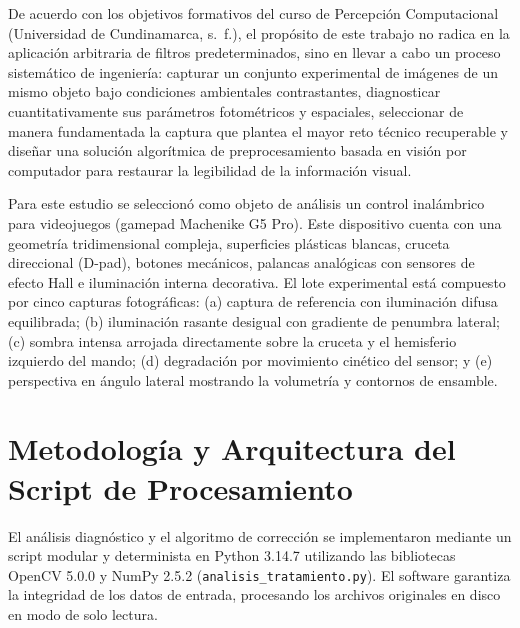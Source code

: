 \documentclass[12pt,letterpaper]{article}
\begin{document}
De acuerdo con los objetivos formativos del curso de Percepci\'on Computacional (Universidad de Cundinamarca, s.~f.), el prop\'osito de este trabajo no radica en la aplicaci\'on arbitraria de filtros predeterminados, sino en llevar a cabo un proceso sistem\'atico de ingenier\'ia: capturar un conjunto experimental de im\'agenes de un mismo objeto bajo condiciones ambientales contrastantes, diagnosticar cuantitativamente sus par\'ametros fotom\'etricos y espaciales, seleccionar de manera fundamentada la captura que plantea el mayor reto t\'ecnico recuperable y dise\~nar una soluci\'on algor\'itmica de preprocesamiento basada en visi\'on por computador para restaurar la legibilidad de la informaci\'on visual.

Para este estudio se seleccion\'o como objeto de an\'alisis un control inal\'ambrico para videojuegos (gamepad Machenike G5 Pro). Este dispositivo cuenta con una geometr\'ia tridimensional compleja, superficies pl\'asticas blancas, cruceta direccional (D-pad), botones mec\'anicos, palancas anal\'ogicas con sensores de efecto Hall e iluminaci\'on interna decorativa. El lote experimental est\'a compuesto por cinco capturas fotogr\'aficas: (a) captura de referencia con iluminaci\'on difusa equilibrada; (b) iluminaci\'on rasante desigual con gradiente de penumbra lateral; (c) sombra intensa arrojada directamente sobre la cruceta y el hemisferio izquierdo del mando; (d) degradaci\'on por movimiento cin\'etico del sensor; y (e) perspectiva en \'angulo lateral mostrando la volumetr\'ia y contornos de ensamble.

\section{Metodolog\'ia y Arquitectura del Script de Procesamiento}
El an\'alisis diagn\'ostico y el algoritmo de correcci\'on se implementaron mediante un script modular y determinista en Python 3.14.7 utilizando las bibliotecas OpenCV 5.0.0 y NumPy 2.5.2 (\texttt{analisis\_tratamiento.py}). El software garantiza la integridad de los datos de entrada, procesando los archivos originales en disco en modo de solo lectura.
\end{document}
